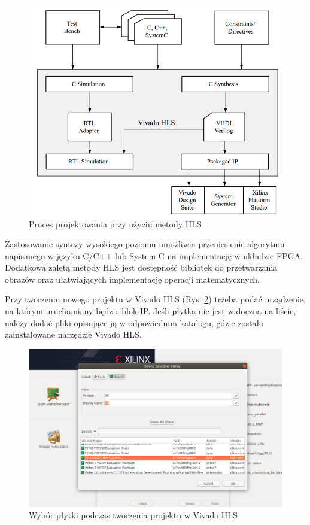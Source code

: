 \begin{figure}[!h]
  \centering
  \includegraphics[width=\textwidth]{img/hls_design_flow.png}
  \caption{Proces projektowania przy użyciu metody HLS}
  \label{hls_design_flow}
\end{figure}

Zastosowanie syntezy wysokiego poziomu umożliwia przeniesienie algorytmu 
napisanego w języku C/C++ lub System C na implementację w układzie FPGA. 
Dodatkową zaletą metody HLS jest dostępność bibliotek do przetwarzania 
obrazów oraz ułatwiających implementację operacji matematycznych. 

Przy tworzeniu nowego projektu w Vivado HLS (Rys. \ref{hls_new_project}) trzeba podać 
urządzenie, na którym uruchamiany będzie blok IP. Jeśli płytka nie jest widoczna na 
liście, należy dodać pliki opisujące ją w odpowiednim katalogu, gdzie zostało 
zainstalowane narzędzie Vivado HLS.  

\begin{figure}[!h]
  \centering
  \includegraphics[width=\textwidth]{img/vivado-hls-new.png}
  \caption{Wybór płytki podczas tworzenia projektu w Vivado HLS}
  \label{hls_new_project}
\end{figure}

